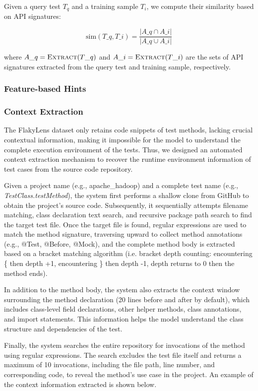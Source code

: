 \documentclass{article}
\begin{document}
Given a query test $T_q$ and a training sample $T_i$, we compute their similarity 
based on API signatures:

\begin{equation}
\text{sim}(T\_q, T\_i) = \frac{|A\_q \cap A\_i|}{|A\_q \cup A\_i|}
\end{equation}

where $A\_q = \textsc{Extract}(T\_q)$ and $A\_i = \textsc{Extract}(T\_i)$ are the sets of API signatures extracted from the query test and training sample, respectively.

\subsubsection{Feature-based Hints}


\subsubsection{Context Extraction}
The FlakyLens dataset only retains code snippets of test methods, lacking crucial contextual information, making it impossible for the model to understand the complete execution environment of the tests. Thus, we designed an automated context extraction mechanism to recover the runtime environment information of test cases from the source code repository.

Given a project name (e.g., apache\_hadoop) and a complete test name (e.g., \textit{TestClass.testMethod}), the system first performs a shallow clone from GitHub to obtain the project's source code. Subsequently, it sequentially attempts filename matching, class declaration text search, and recursive package path search to find the target test file. Once the target file is found, regular expressions are used to match the method signature, traversing upward to collect method annotations (e.g., @Test, @Before, @Mock), and the complete method body is extracted based on a bracket matching algorithm (i.e. bracket depth counting: encountering \{ then depth +1, encountering \} then depth -1, depth returns to 0 then  the method ends).

In addition to the method body, the system also extracts the context window surrounding the method declaration (20 lines before and after by default), which includes class-level field declarations, other helper methods, class annotations, and import statements. This information helps the model understand the class structure and dependencies of the test.

Finally, the system searches the entire repository for invocations of the method using regular expressions. The search excludes the test file itself and returns a maximum of 10 invocations, including the file path, line number, and corresponding code, to reveal the method's use case in the project. An example of the context information extracted is shown below.
\end{document}
